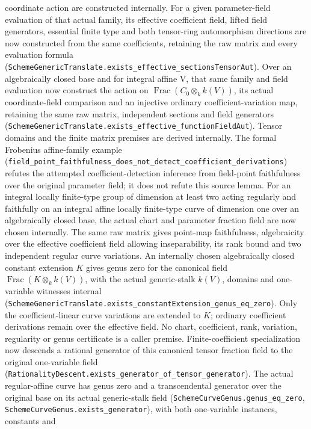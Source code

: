 \documentclass[11pt,oneside]{article}
\theoremstyle{definition}
\theoremstyle{remark}
\newcommand{\lean}[1]{\nolinkurl{#1}}
\begin{document}
coordinate action are constructed internally. For a given parameter-field evaluation of
that actual family, its effective coefficient field, lifted field generators, essential finite
type and both tensor-ring automorphism directions are now constructed from the same
coefficients, retaining the raw matrix and every evaluation formula
(\lean{SchemeGenericTranslate.exists_effective_sectionsTensorAut}). Over an algebraically
closed base and for integral affine V, that same family and field evaluation now construct the
action on $\operatorname{Frac}(C_0\otimes_k k(V))$, its actual coordinate-field comparison
and an injective ordinary coefficient-variation map, retaining the same raw matrix,
independent sections and field generators
(\lean{SchemeGenericTranslate.exists_effective_functionFieldAut}). Tensor domains and the
finite matrix premises are derived internally. The formal Frobenius affine-family example
(\lean{field_point_faithfulness_does_not_detect_coefficient_derivations}) refutes the attempted
coefficient-detection inference from field-point faithfulness over the original parameter
field; it does not refute this source lemma. For an integral locally finite-type group of
dimension at least two acting regularly and faithfully on an integral affine locally finite-type
curve of dimension one over an algebraically closed base, the actual chart and parameter
fraction field are now chosen internally. The same raw matrix gives point-map faithfulness,
algebraicity over the effective coefficient field allowing inseparability, its rank bound and
two independent regular curve variations. An internally chosen algebraically closed constant
extension $K$ gives genus zero for the canonical field
$\operatorname{Frac}(K\otimes_k k(V))$, with the actual generic-stalk $k(V)$, domains and
one-variable witnesses internal
(\lean{SchemeGenericTranslate.exists_constantExtension_genus_eq_zero}). Only the
coefficient-linear curve variations are extended to $K$; ordinary coefficient derivations
remain over the effective field. No chart, coefficient, rank, variation, regularity or genus
certificate is a caller premise. Finite-coefficient specialization now descends a rational
generator of this canonical tensor fraction field to the original one-variable field
(\lean{RationalityDescent.exists_generator_of_tensor_generator}). The actual regular-affine
curve has genus zero and a transcendental generator over the original base on its actual
generic-stalk field (\lean{SchemeCurveGenus.genus_eq_zero},
\lean{SchemeCurveGenus.exists_generator}), with both one-variable instances, constants and
\end{document}
